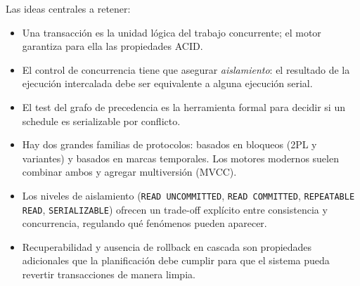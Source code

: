 \documentclass[11pt,a4paper]{article}
\begin{document}
Las ideas centrales a retener:

\begin{itemize}
    \item Una transacción es la unidad lógica del trabajo concurrente; el
    motor garantiza para ella las propiedades ACID.
    \item El control de concurrencia tiene que asegurar
    \emph{aislamiento}: el resultado de la ejecución intercalada debe
    ser equivalente a alguna ejecución serial.
    \item El test del grafo de precedencia es la herramienta formal para
    decidir si un schedule es serializable por conflicto.
    \item Hay dos grandes familias de protocolos: basados en bloqueos
    (2PL y variantes) y basados en marcas temporales. Los motores
    modernos suelen combinar ambos y agregar multiversión (MVCC).
    \item Los niveles de aislamiento (\texttt{READ UNCOMMITTED},
    \texttt{READ COMMITTED}, \texttt{REPEATABLE READ},
    \texttt{SERIALIZABLE}) ofrecen un trade-off explícito entre
    consistencia y concurrencia, regulando qué fenómenos pueden aparecer.
    \item Recuperabilidad y ausencia de rollback en cascada son
    propiedades adicionales que la planificación debe cumplir para que
    el sistema pueda revertir transacciones de manera limpia.
\end{itemize}
\end{document}
